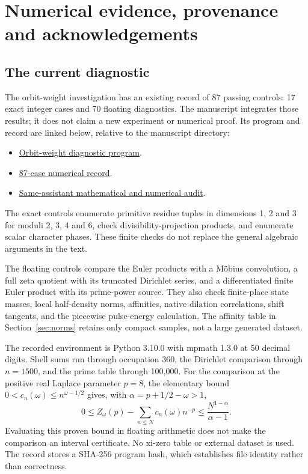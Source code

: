 \section{Numerical evidence, provenance and acknowledgements}
\label{app:validation}

\subsection{The current diagnostic}

The orbit-weight investigation has an existing record of 87 passing
controls: 17 exact integer cases and 70 floating diagnostics. The
manuscript integrates those results; it does not claim a new experiment
or numerical proof. Its program and record are linked below, relative
to the manuscript directory:
\begin{itemize}
\item \href{numerics/check_arithmetic_orbit_weights.py}{Orbit-weight diagnostic program}.
\item \href{numerics/records/arithmetic-orbit-weights-20260923.json}{87-case numerical record}.
\item \href{reviews/review_codex_arithmetic_orbit_weights_20260923.md}{Same-assistant mathematical and numerical audit}.
\end{itemize}

The exact controls enumerate primitive residue tuples in dimensions
1, 2 and 3 for moduli 2, 3, 4 and 6, check divisibility-projection
products, and enumerate scalar character phases. These finite checks
do not replace the general algebraic arguments in the text.

The floating controls compare the Euler products with a M\"obius
convolution, a full zeta quotient with its truncated Dirichlet series,
and a differentiated finite Euler product with its prime-power source.
They also check finite-place state masses, local half-density norms,
affinities, native dilation correlations, shift tangents, and the
piecewise pulse-energy calculation. The affinity table in
Section~\ref{sec:norms} retains only compact samples, not a large
generated dataset.

The recorded environment is Python 3.10.0 with mpmath 1.3.0 at
50 decimal digits. Shell sums run through occupation 360, the
Dirichlet comparison through $n=1500$, and the prime table through
100,000. For the comparison at the positive real Laplace parameter
$p=8$, the elementary
bound $0<c_n(\omega)\le n^{\omega-1/2}$ gives, with
$\alpha=p+1/2-\omega>1$,
\begin{equation}
 0\le Z_\omega(p)-\sum_{n\le N}c_n(\omega)n^{-p}
 \le\frac{N^{1-\alpha}}{\alpha-1}.
\end{equation}
Evaluating this proven bound in floating arithmetic does not make the
comparison an interval certificate. No xi-zero table or external
dataset is used. The record stores a SHA-256 program hash, which
establishes file identity rather than correctness.

